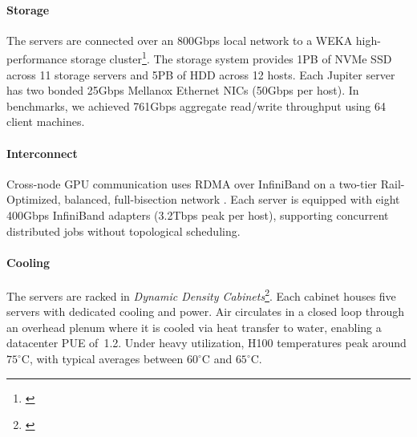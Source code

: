 \paragraph{Storage} The servers are connected over an 800Gbps local network to a WEKA high-performance storage cluster\footnote{\href{https://www.weka.io/}{}}. The storage system provides 1PB of NVMe SSD across 11 storage servers and 5PB of HDD across 12 hosts. Each Jupiter server has two bonded 25Gbps Mellanox Ethernet NICs (50Gbps per host). In benchmarks, we achieved 761Gbps aggregate read/write throughput using 64 client machines.

\paragraph{Interconnect} Cross-node GPU communication uses RDMA over InfiniBand on a two-tier Rail-Optimized, balanced, full-bisection network \citep{wang2023rail}. Each server is equipped with eight 400Gbps InfiniBand adapters (3.2Tbps peak per host), supporting concurrent distributed jobs without topological scheduling.

\paragraph{Cooling} The servers are racked in \textit{Dynamic Density Cabinets}\footnote{\href{https://www.cirrascale.com/products-and-services/cabinet-technologies}{}}. Each cabinet houses five servers with dedicated cooling and power. Air circulates in a closed loop through an overhead plenum where it is cooled via heat transfer to water, enabling a datacenter PUE of~1.2. Under heavy utilization, H100 temperatures peak around $75^\circ\mathrm{C}$, with typical averages between $60^\circ\mathrm{C}$ and $65^\circ\mathrm{C}$.
